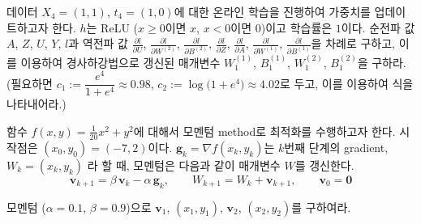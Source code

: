 \documentclass[11pt,a4paper]{article}
\newcommand{\pd}[2]{\frac{\partial #1}{\partial #2}}
\begin{document}
\begin{problems}
데이터 $X_4=(1,1)$, $t_4=(1,0)$에 대한 온라인 학습을 진행하여 가중치를 업데이트하고자 한다.
$h$는 ReLU ($x\ge0$이면 $x$, $x<0$이면 $0$)이고 학습률은 $1$이다.
순전파 값 $A$, $Z$, $U$, $Y$, $l$과 역전파 값 $\pd{l}{U}$, $\pd{l}{W^{(2)}}$, $\pd{l}{B^{(2)}}$, $\pd{l}{Z}$, $\pd{l}{A}$,
$\pd{l}{W^{(1)}}$, $\pd{l}{B^{(1)}}$을 차례로 구하고,
이를 이용하여 경사하강법으로 갱신된 매개변수 $W^{(1)}_1$, $B^{(1)}_1$, $W^{(2)}_1$, $B^{(2)}_1$을 구하라.
(필요하면 $c_1:=\dfrac{e^{4}}{1+e^{4}}\approx0.98$, $c_2:=\log\bigl(1+e^{4}\bigr)\approx4.02$로 두고, 이를 이용하여 식을 나타내어라.)


\item 함수 $f(x,y)=\frac{1}{20}x^2+y^2$에 대해서 모멘텀 method로 최적화를 수행하고자 한다. 시작점은 $(x_0,y_0)=(-7,2)$이다.
$\bm g_k=\nabla f(x_k,y_k)$는 $k$번째 단계의 gradient, $W_k=(x_k,y_k)$ 라 할 때, 
모멘텀은 다음과 같이 매개변수 $W$를 갱신한다.
\[
\bm v_{k+1}=\beta\,\bm v_k-\alpha\,\bm g_k,
\qquad
W_{k+1}=W_k+\bm v_{k+1},
\qquad
\bm v_0=\bm 0
\]

모멘텀 ($\alpha=0.1$, $\beta=0.9$)으로 $\bm v_1$, $(x_1,y_1)$, $\bm v_2$, $(x_2,y_2)$를 구하여라.


\end{problems}
\end{document}

